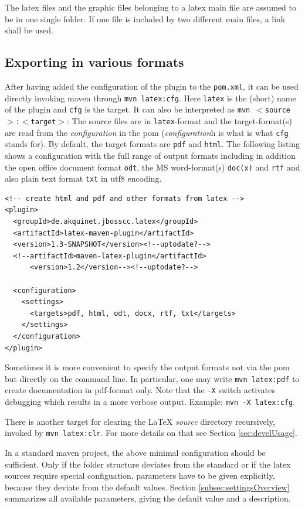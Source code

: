 \documentclass[12pt]{article}
\begin{document}
The latex files and the graphic files belonging to a latex main file 
are assumed to be in one single folder. 
If one file is included by two different main files, 
a link shall be used. 


\subsection{Exporting in various formats}\label{sec:stableUsage}


After having added the configuration of the plugin to the {\tt pom.xml}, 
it can be used directly invoking maven through 
{\tt mvn latex:cfg}. 
Here {\tt latex} is the (short) name of the plugin and {\tt cfg} is the target. 
It can also be interpreted as {\tt mvn $<$source$>$:$<$target$>$}: 
The source files are in {\tt latex}-format and the target-format(s) 
are read from the {\em configuration} in the pom 
({\em configuration}h is what is what {\tt cfg} stands for). 
By default, the target formats are {\tt pdf} and {\tt html}. 
The following listing shows a configuration 
with the full range of output formats including in addition 
the open office document format {\tt odt}, 
the MS word-format(s) {\tt doc(x)} and {\tt rtf}
and also plain text format {\tt txt} in utf8 encoding. 
%
\lstset{language=xml, basicstyle=\small}
\begin{lstlisting}
<!-- create html and pdf and other formats from latex -->
<plugin>
  <groupId>de.akquinet.jbosscc.latex</groupId>
  <artifactId>latex-maven-plugin</artifactId>
  <version>1.3-SNAPSHOT</version><!--uptodate?-->
  <!--artifactId>maven-latex-plugin</artifactId>
      <version>1.2</version--><!--uptodate?-->
	
  <configuration>
    <settings>
      <targets>pdf, html, odt, docx, rtf, txt</targets>
    </settings>
  </configuration>
</plugin>
\end{lstlisting}

Sometimes it is more convenient 
to specify the output formats not via the pom 
but directly on the command line. 
In particular, one may write {\tt mvn latex:pdf} to create documentation 
in pdf-format only. 
Note that the {\tt -X} switch activates debugging 
which results in a more verbose output. 
Example: {\tt mvn -X latex:cfg}. 

There is another target for clearing the LaTeX {\em source} directory 
recursively, invoked by {\tt mvn latex:clr}. 
For more details on that see Section \ref{sec:develUsage}. 

In a standard maven project, 
the above minimal configuration should be sufficient. 
Only if the folder structure deviates from the standard 
or if the latex sources require special configuation, 
parameters have to be given explicitly, 
because they deviate from the default values. 
Section \ref{subsec:settingsOverview} summarizes all available parameters, 
giving the default value and a description. 
\end{document}
